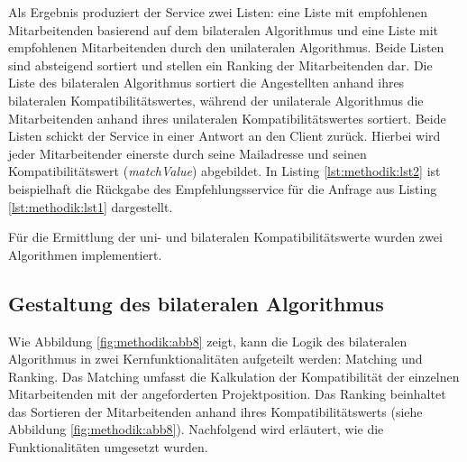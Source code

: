 Als Ergebnis produziert der Service zwei Listen: eine Liste mit empfohlenen Mitarbeitenden basierend auf dem bilateralen Algorithmus und eine Liste mit empfohlenen Mitarbeitenden durch den unilateralen Algorithmus.
Beide Listen sind absteigend sortiert und stellen ein Ranking der Mitarbeitenden dar.
Die Liste des bilateralen Algorithmus sortiert die Angestellten anhand ihres bilateralen Kompatibilitätswertes, während der unilaterale Algorithmus die Mitarbeitenden anhand ihres unilateralen Kompatibilitätswertes sortiert.
Beide Listen schickt der Service in einer Antwort an den Client zurück.
Hierbei wird jeder Mitarbeitender einerste durch seine Mailadresse und seinen Kompatibilitätswert (\textit{matchValue}) abgebildet.
In Listing \ref{lst:methodik:lst2} ist beispielhaft die Rückgabe des Empfehlungsservice für die Anfrage aus Listing \ref{lst:methodik:lst1} dargestellt.



Für die Ermittlung der uni- und bilateralen Kompatibilitätswerte wurden zwei Algorithmen implementiert.


\subsection{Gestaltung des bilateralen Algorithmus}
Wie Abbildung \ref{fig:methodik:abb8} zeigt, kann die Logik des bilateralen Algorithmus in zwei Kernfunktionalitäten aufgeteilt werden: Matching und Ranking.
Das Matching umfasst die Kalkulation der Kompatibilität der einzelnen Mitarbeitenden mit der angeforderten Projektposition.
Das Ranking beinhaltet das Sortieren der Mitarbeitenden anhand ihres Kompatibilitätswerts (siehe Abbildung \ref{fig:methodik:abb8}).
Nachfolgend wird erläutert, wie die Funktionalitäten umgesetzt wurden.

